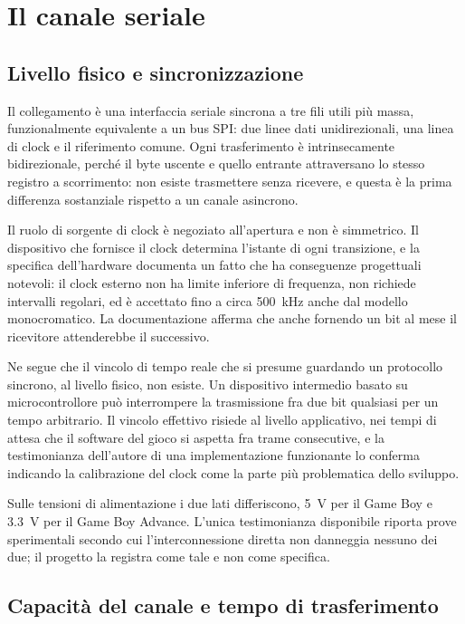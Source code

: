 \documentclass[11pt,a4paper]{article}
\begin{document}
\section{Il canale seriale}
\label{sec:canale}

\subsection{Livello fisico e sincronizzazione}

Il collegamento è una interfaccia seriale sincrona a tre fili utili più massa, funzionalmente equivalente a un bus SPI: due linee dati unidirezionali, una linea di clock e il riferimento comune. Ogni trasferimento è intrinsecamente bidirezionale, perché il byte uscente e quello entrante attraversano lo stesso registro a scorrimento: non esiste trasmettere senza ricevere, e questa è la prima differenza sostanziale rispetto a un canale asincrono.

Il ruolo di sorgente di clock è negoziato all'apertura e non è simmetrico. Il dispositivo che fornisce il clock determina l'istante di ogni transizione, e la specifica dell'hardware documenta un fatto che ha conseguenze progettuali notevoli: il clock esterno non ha limite inferiore di frequenza, non richiede intervalli regolari, ed è accettato fino a circa \SI{500}{kHz} anche dal modello monocromatico. La documentazione afferma che anche fornendo un bit al mese il ricevitore attenderebbe il successivo.

Ne segue che il vincolo di tempo reale che si presume guardando un protocollo sincrono, al livello fisico, non esiste. Un dispositivo intermedio basato su microcontrollore può interrompere la trasmissione fra due bit qualsiasi per un tempo arbitrario. Il vincolo effettivo risiede al livello applicativo, nei tempi di attesa che il software del gioco si aspetta fra trame consecutive, e la testimonianza dell'autore di una implementazione funzionante lo conferma indicando la calibrazione del clock come la parte più problematica dello sviluppo.

Sulle tensioni di alimentazione i due lati differiscono, \SI{5}{V} per il Game Boy e \SI{3.3}{V} per il Game Boy Advance. L'unica testimonianza disponibile riporta prove sperimentali secondo cui l'interconnessione diretta non danneggia nessuno dei due; il progetto la registra come tale e non come specifica.

\subsection{Capacità del canale e tempo di trasferimento}
\end{document}
